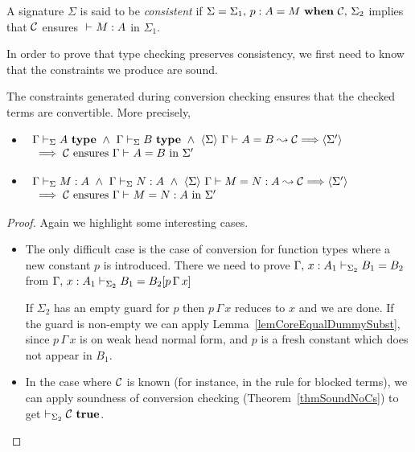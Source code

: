 \begin{definition} \label{defConsistentSig}
    A signature $\Sigma$ is said to be {\em consistent} if $\Sigma = \Ext
    {\Sigma_1} \Ext {\ConstDecl p A M \Cs} \Sigma_2$ implies that $\Cs$ ensures
    $\HasTypeC {} M A$ in $\Sigma_1$.
\end{definition}

In order to prove that type checking preserves consistency, we first need to
know that the constraints we produce are sound.

\begin{lemma} \label{lemSoundConstraints}
    The constraints generated during conversion checking ensures that the
    checked terms are convertible.
\if {}
    More precisely,
    \begin{itemize}
	\item \( \begin{array}[t]{l}
		    \IsTypeCS \Sigma \Gamma A
		    ~ \wedge ~ \IsTypeCS \Sigma \Gamma B
		    ~ \wedge ~ \ExplicitJudgement \Sigma {\EqualType A B \Cs} {\Sigma'}
		    \\ {} \implies \mbox{$\Cs$ ensures $\EqualTypeC \Gamma A B$ in $\Sigma'$}
	      \end{array} \)
	\item \( \begin{array}[t]{l}
		    \HasTypeCS \Sigma \Gamma M A
		    ~ \wedge ~ \HasTypeCS \Sigma \Gamma N A
		    ~ \wedge ~ \ExplicitJudgement \Sigma {\Equal M N A \Cs} {\Sigma'}
		    \\ {} \implies \mbox{$\Cs$ ensures $\EqualC \Gamma M N A$ in $\Sigma'$}
	      \end{array} \)
    \end{itemize}
\fi
\end{lemma}

\if {}
\begin{proof}
    Again we highlight some interesting cases.
    \begin{itemize}
	\item 
	
	The only difficult case is the case of conversion for function types
	where a new constant $p$ is introduced. There we need to prove
	$\EqualTypeCS {\Sigma_2} {\Ext \Gamma x : A_1} {B_1} {B_2}$ from
	$\EqualTypeCS {\Sigma_2} {\Ext \Gamma x : A_1} {B_1} {\SubstD {B_2} {p
	\, \Gamma \, x}}$

	If $\Sigma_2$ has an empty guard for $p$ then $p \, \Gamma \, x$
	reduces to $x$ and we are done. If the guard is non-empty we can apply
	Lemma~\ref{lemCoreEqualDummySubst}, since $p \, \Gamma \, x$ is on weak
	head normal form, and $p$ is a fresh constant which does not appear in
	$B_1$.

	\item In the case where $\Cs$ is known (for instance, in the rule for
	blocked terms), we can apply soundness of conversion checking
	(Theorem~\ref{thmSoundNoCs}) to get $\TrueConstr {\Sigma_2} \Cs$.

    \end{itemize}
\end{proof}
\fi

